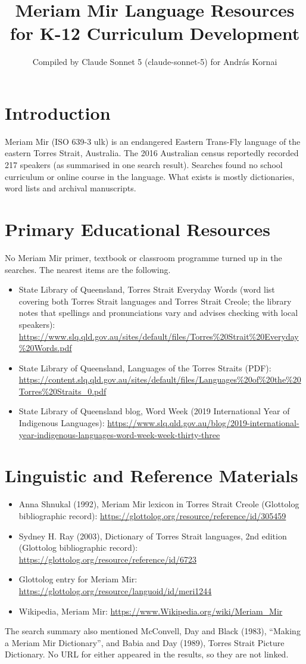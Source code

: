 \documentclass[12pt]{article}
\title{Meriam Mir Language Resources for K-12 Curriculum Development}
\author{Compiled by Claude Sonnet 5 (claude-sonnet-5) for Andr\'as Kornai}
\date{}
\begin{document}
\maketitle

\section{Introduction}
Meriam Mir (ISO 639-3 ulk) is an endangered Eastern Trans-Fly language of the eastern Torres Strait, Australia. The 2016 Australian census reportedly recorded 217 speakers (as summarised in one search result). Searches found no school curriculum or online course in the language. What exists is mostly dictionaries, word lists and archival manuscripts.

\section{Primary Educational Resources}
No Meriam Mir primer, textbook or classroom programme turned up in the searches. The nearest items are the following.
\begin{itemize}
\item State Library of Queensland, Torres Strait Everyday Words (word list covering both Torres Strait languages and Torres Strait Creole; the library notes that spellings and pronunciations vary and advises checking with local speakers): \url{https://www.slq.qld.gov.au/sites/default/files/Torres%20Strait%20Everyday%20Words.pdf}
\item State Library of Queensland, Languages of the Torres Straits (PDF): \url{https://content.slq.qld.gov.au/sites/default/files/Languages%20of%20the%20Torres%20Straits_0.pdf}
\item State Library of Queensland blog, Word Week (2019 International Year of Indigenous Languages): \url{https://www.slq.qld.gov.au/blog/2019-international-year-indigenous-languages-word-week-week-thirty-three}
\end{itemize}

\section{Linguistic and Reference Materials}
\begin{itemize}
\item Anna Shnukal (1992), Meriam Mir lexicon in Torres Strait Creole (Glottolog bibliographic record): \url{https://glottolog.org/resource/reference/id/305459}
\item Sydney H. Ray (2003), Dictionary of Torres Strait languages, 2nd edition (Glottolog bibliographic record): \url{https://glottolog.org/resource/reference/id/6723}
\item Glottolog entry for Meriam Mir: \url{https://glottolog.org/resource/languoid/id/meri1244}
\item Wikipedia, Meriam Mir: \url{https://www.Wikipedia.org/wiki/Meriam_Mir}
\end{itemize}
The search summary also mentioned McConvell, Day and Black (1983), ``Making a Meriam Mir Dictionary'', and Babia and Day (1989), Torres Strait Picture Dictionary. No URL for either appeared in the results, so they are not linked.
\end{document}

